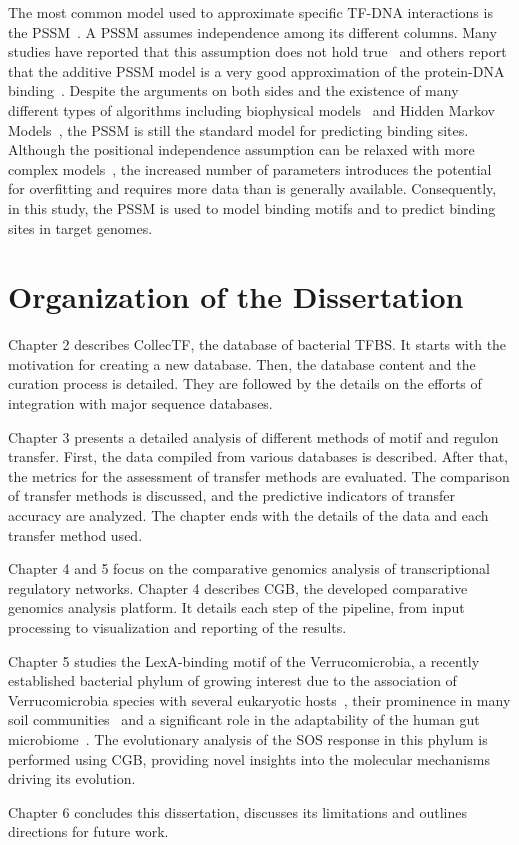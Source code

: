 The most common model used to approximate specific TF-DNA interactions is the
PSSM~\citep{stormo2000dna, sharon2008feature}. A PSSM assumes independence among
its different columns. Many studies have reported that this assumption does not
hold true~\citep{man2001non, bulyk2002nucleotides, tomovic2007position,
  osada2004comparative} and others report that the additive PSSM model is a
very good approximation of the protein-DNA
binding~\citep{benos2002additivity}. Despite the arguments on both sides and
the existence of many different types of algorithms including biophysical
models~\citep{stormo1998specificity, djordjevic2003biophysical} and Hidden
Markov Models~\citep{sinha2003probabilistic, drawid2009ohmm,
  salzberg1998microbial}, the PSSM is still the standard model for predicting
binding sites. Although the positional independence assumption can be relaxed
with more complex models~\citep{ben2005identification, zhao2012improved,
  siddharthan2010dinucleotide, barash2003modeling}, the increased number of
parameters introduces the potential for overfitting and requires more data than
is generally available. Consequently, in this study, the PSSM is used to model
binding motifs and to predict binding sites in target genomes.

\section{Organization of the Dissertation}

Chapter 2 describes CollecTF, the database of bacterial TFBS. It starts with
the motivation for creating a new database. Then, the database content and the
curation process is detailed. They are followed by the details on the efforts
of integration with major sequence databases.

Chapter 3 presents a detailed analysis of different methods of motif and
regulon transfer. First, the data compiled from various databases is
described. After that, the metrics for the assessment of transfer methods are
evaluated. The comparison of transfer methods is discussed, and the predictive
indicators of transfer accuracy are analyzed. The chapter ends with the details
of the data and each transfer method used.

Chapter 4 and 5 focus on the comparative genomics analysis of transcriptional
regulatory networks. Chapter 4 describes CGB, the developed comparative
genomics analysis platform. It details each step of the pipeline, from input
processing to visualization and reporting of the results.

Chapter 5 studies the LexA-binding motif of the Verrucomicrobia, a recently
established bacterial phylum of growing interest due to the association of
Verrucomicrobia species with several eukaryotic hosts~\citep{sait2011genomic},
their prominence in many soil communities~\citep{bergmann2011under} and a
significant role in the adaptability of the human gut
microbiome~\citep{dubourg2013high}. The evolutionary analysis of the SOS
response in this phylum is performed using CGB, providing novel insights into the
molecular mechanisms driving its evolution.

Chapter 6 concludes this dissertation, discusses its limitations and
outlines directions for future work.
